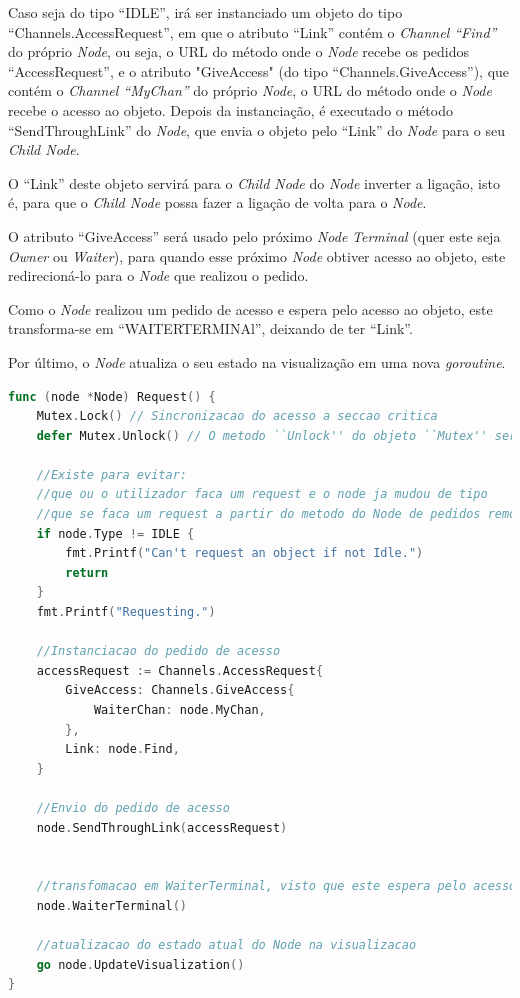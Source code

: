 Caso seja do tipo ``IDLE'', irá ser instanciado um objeto do tipo ``Channels.AccessRequest'', em que o atributo
``Link'' contém o \emph{Channel ``Find''}  do próprio \emph{Node}, ou seja, o \acs{URL} do método
onde o \emph{Node} recebe os pedidos ``AccessRequest'', e
o atributo "GiveAccess" (do tipo ``Channels.GiveAccess''), que contém o \emph{Channel ``MyChan''} do próprio
\emph{Node}, o \acs{URL} do método
onde o \emph{Node} recebe o acesso ao objeto.
Depois da instanciação, é executado o método ``SendThroughLink'' do \emph{Node}, que envia o objeto 
pelo ``Link'' do \emph{Node} para o seu \emph{Child Node}.

O ``Link'' deste objeto servirá para o \emph{Child Node} do \emph{Node} inverter a ligação, isto é, 
para que o \emph{Child Node} possa fazer a ligação de volta para o \emph{Node}.

O atributo ``GiveAccess'' será usado pelo próximo \emph{Node} \emph{Terminal} (quer este seja \emph{Owner} ou \emph{Waiter}), 
para quando esse próximo \emph{Node} obtiver acesso ao objeto, este redirecioná-lo para o \emph{Node} que realizou o pedido.

Como o \emph{Node} realizou um pedido de acesso e espera pelo acesso ao objeto, este transforma-se em 
``WAITER\textunderscore TERMINAl'', deixando de ter ``Link''.

Por último, o \emph{Node} atualiza o seu estado na visualização em uma nova \emph{goroutine}.


\begin{lstlisting}[caption={Método ``Request''},language=Go]
func (node *Node) Request() {
	Mutex.Lock() // Sincronizacao do acesso a seccao critica
	defer Mutex.Unlock() // O metodo ``Unlock'' do objeto ``Mutex'' sera executado caso o metodo ``Request'' termine

	//Existe para evitar:
	//que ou o utilizador faca um request e o node ja mudou de tipo
	//que se faca um request a partir do metodo do Node de pedidos remotos
	if node.Type != IDLE {
		fmt.Printf("Can't request an object if not Idle.")
		return
	}
	fmt.Printf("Requesting.")

	//Instanciacao do pedido de acesso
	accessRequest := Channels.AccessRequest{
		GiveAccess: Channels.GiveAccess{
			WaiterChan: node.MyChan,
		},
		Link: node.Find,
	}

	//Envio do pedido de acesso
	node.SendThroughLink(accessRequest)


	//transfomacao em WaiterTerminal, visto que este espera pelo acesso
	node.WaiterTerminal()

	//atualizacao do estado atual do Node na visualizacao
	go node.UpdateVisualization()
}
\end{lstlisting}


